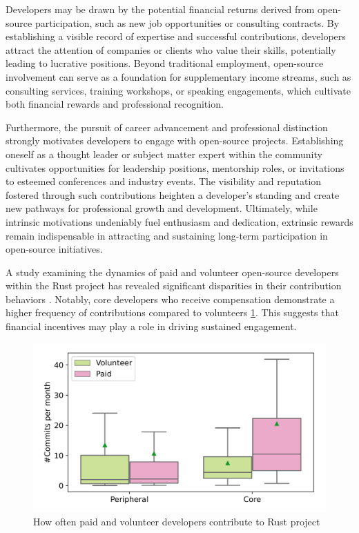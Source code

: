 Developers may be drawn by the potential financial returns derived from open-source participation, such as new job opportunities or consulting contracts. By establishing a visible record of expertise and successful contributions, developers attract the attention of companies or clients who value their skills, potentially leading to lucrative positions. Beyond traditional employment, open-source involvement can serve as a foundation for supplementary income streams, such as consulting services, training workshops, or speaking engagements, which cultivate both financial rewards and professional recognition.

Furthermore, the pursuit of career advancement and professional distinction strongly motivates developers to engage with open-source projects. Establishing oneself as a thought leader or subject matter expert within the community cultivates opportunities for leadership positions, mentorship roles, or invitations to esteemed conferences and industry events.  The visibility and reputation fostered through such contributions heighten a developer's standing and create new pathways for professional growth and development.  Ultimately, while intrinsic motivations undeniably fuel enthusiasm and dedication,  extrinsic rewards remain indispensable in attracting and sustaining long-term participation in open-source initiatives.

A study examining the dynamics of paid and volunteer open-source developers within the Rust project has revealed significant disparities in their contribution behaviors \citep{08zhang2024paid}. Notably, core developers who receive compensation demonstrate a higher frequency of contributions compared to volunteers \ref{fig:contribution_frequency}. This suggests that financial incentives may play a role in driving sustained engagement.

\begin{figure}[ht]
    \centering
    \includegraphics[width=0.65\linewidth]{figs/Contribution_frequency.png}
    \caption{How often paid and volunteer developers contribute to Rust project \citep{08zhang2024paid}}
    \label{fig:contribution_frequency}
\end{figure}


